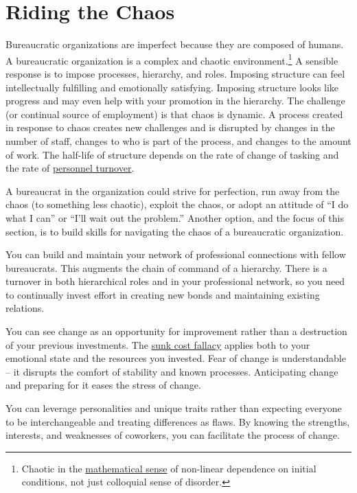 \section{Riding the Chaos\label{sec:process-chaos}}

Bureaucratic organizations are imperfect because they are composed of humans. %
A bureaucratic organization is a complex and chaotic environment.\footnote{Chaotic in the \href{https://en.wikipedia.org/wiki/Chaos_theory}{mathematical sense} 
of non-linear dependence on initial conditions, not just colloquial sense of disorder.} A sensible response is to impose processes, hierarchy, and roles. Imposing structure can feel intellectually fulfilling and emotionally satisfying. Imposing structure looks like progress and may even help with your promotion in the hierarchy. The challenge (or continual source of employment) is that chaos is dynamic. A process created in response to chaos creates new challenges and is disrupted by changes in the number of staff, changes to who is part of the process, and changes to the amount of work. The half-life of structure depends on the rate of change of tasking and the rate of 
%
\hyperref[sec:turnover]{personnel turnover}.

A bureaucrat in the organization could strive for perfection, run away from the chaos (to something less chaotic), exploit the chaos, or adopt an attitude of ``I do what I can'' or ``I'll wait out the problem.'' 
Another option, and the focus of this section, is to build skills for navigating the chaos of a bureaucratic organization.

You can build and maintain your network of professional connections with fellow bureaucrats. 
%
%
This augments the chain of command of a hierarchy. There is a turnover in both hierarchical roles and in your professional network, so you need to continually invest effort in creating new bonds and maintaining existing relations. 

You can see change as an opportunity for improvement rather than a destruction of your previous investments. The \href{https://en.wikipedia.org/wiki/Sunk_cost}{sunk cost fallacy}
applies both to your emotional state and the resources you invested. Fear of change is understandable -- it disrupts the comfort of stability and known processes. Anticipating change and preparing for it eases the stress of change.

You can leverage personalities and unique traits rather than expecting everyone to be interchangeable and treating differences as flaws. 
By knowing the strengths, interests, and weaknesses of coworkers, you can facilitate the process of change. 